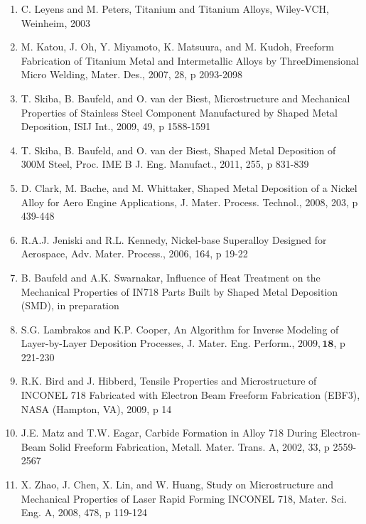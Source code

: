 \documentclass[10pt]{article}
\begin{document}
\begin{enumerate}
  \item C. Leyens and M. Peters, Titanium and Titanium Alloys, Wiley-VCH, Weinheim, 2003

  \item M. Katou, J. Oh, Y. Miyamoto, K. Matsuura, and M. Kudoh, Freeform Fabrication of Titanium Metal and Intermetallic Alloys by ThreeDimensional Micro Welding, Mater. Des., 2007, 28, p 2093-2098

  \item T. Skiba, B. Baufeld, and O. van der Biest, Microstructure and Mechanical Properties of Stainless Steel Component Manufactured by Shaped Metal Deposition, ISIJ Int., 2009, 49, p 1588-1591

  \item T. Skiba, B. Baufeld, and O. van der Biest, Shaped Metal Deposition of 300M Steel, Proc. IME B J. Eng. Manufact., 2011, 255, p 831-839

  \item D. Clark, M. Bache, and M. Whittaker, Shaped Metal Deposition of a Nickel Alloy for Aero Engine Applications, J. Mater. Process. Technol., 2008, 203, p 439-448

  \item R.A.J. Jeniski and R.L. Kennedy, Nickel-base Superalloy Designed for Aerospace, Adv. Mater. Process., 2006, 164, p 19-22

  \item B. Baufeld and A.K. Swarnakar, Influence of Heat Treatment on the Mechanical Properties of IN718 Parts Built by Shaped Metal Deposition (SMD), in preparation

  \item S.G. Lambrakos and K.P. Cooper, An Algorithm for Inverse Modeling of Layer-by-Layer Deposition Processes, J. Mater. Eng. Perform., $2009, \mathbf{1 8}$, p 221-230

  \item R.K. Bird and J. Hibberd, Tensile Properties and Microstructure of INCONEL 718 Fabricated with Electron Beam Freeform Fabrication (EBF3), NASA (Hampton, VA), 2009, p 14

  \item J.E. Matz and T.W. Eagar, Carbide Formation in Alloy 718 During Electron-Beam Solid Freeform Fabrication, Metall. Mater. Trans. A, 2002, 33, p 2559-2567

  \item X. Zhao, J. Chen, X. Lin, and W. Huang, Study on Microstructure and Mechanical Properties of Laser Rapid Forming INCONEL 718, Mater. Sci. Eng. A, 2008, 478, p 119-124


\end{enumerate}
\end{document}
